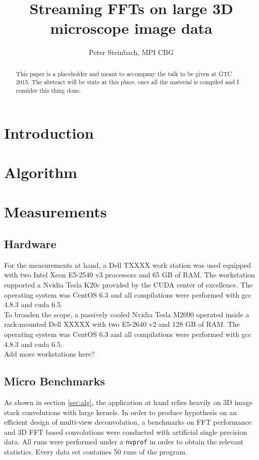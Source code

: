 \documentclass [12pt]{article}
\title{Streaming FFTs on large 3D microscope image data}
\author{Peter Steinbach, MPI CBG}
\begin{document}
\maketitle
\begin{abstract}
  This paper is a placeholder and meant to accompany the talk to be given at GTC 2015. The abstract will be state at this place, once all the material is compiled and I consider this thing done.
\end{abstract}

\section{Introduction}
\section[sec:alg]{Algorithm}
\section{Measurements}

\subsection{Hardware}
For the measurements at hand, a Dell TXXXX work station was used equipped with two Intel Xeon E5-2540 v3 processors and 65 GB of RAM. The workstation supported a Nvidia Tesla K20c provided by the CUDA center of excellence. The operating system was CentOS 6.3 and all compilations were performed with gcc 4.8.3 and cuda 6.5.\\ 
To broaden the scope, a passively cooled Nvidia Tesla M2090 operated inside a rack-mounted Dell XXXXX with two E5-2640 v2 and 128 GB of RAM. The operating system was CentOS 6.3 and all compilations were performed with gcc 4.8.3 and cuda 6.5.\\
 Add more workstations here?
\subsection{Micro Benchmarks}

As shown in section \ref{sec:alg}, the application at hand relies heavily on 3D image stack convolutions with large kernels. In order to produce hypothesis on an efficient design of multi-view deconvolution, a benchmarks on FFT performance and 3D FFT based convolutions were conducted with artificial single precision data. All runs were performed under a \texttt{nvprof} in order to obtain the relevant statistics. Every data set containes 50 runs of the program. 
\end{document}

